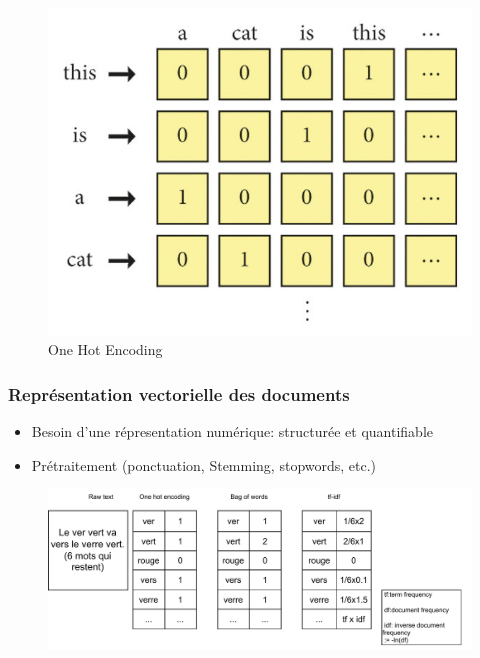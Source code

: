 \documentclass{beamer}
\begin{document}
\begin{frame}
\begin{figure}
\begin{minipage}[b]{0.49\textwidth}
        \includegraphics[width=\textwidth]{ohe.png}
        \caption{One Hot Encoding}
    \end{minipage}
\end{figure}
\end{frame}

\begin{frame}
\frametitle{Représentation vectorielle des documents}
\begin{itemize}
    \item Besoin d'une répresentation numérique: structurée et quantifiable 
    \item Prétraitement (ponctuation, Stemming, stopwords, etc.)
\end{itemize}

\begin{figure}
\centering
\includegraphics[width=\linewidth]{puppy.pdf}
\end{figure}
\end{frame}
\end{document}
